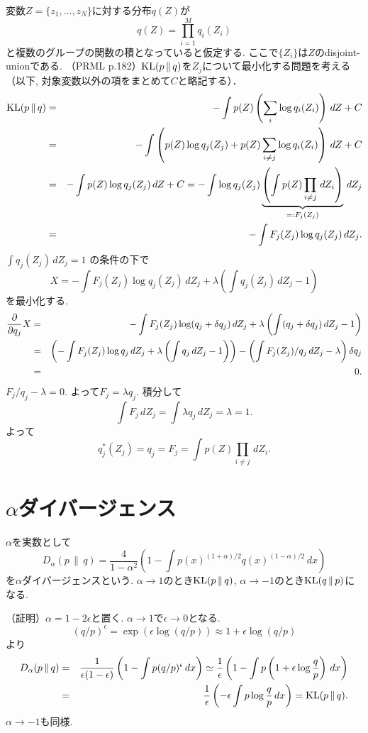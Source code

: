 変数$Z=\{z_1, \ldots, z_N \}$に対する分布$q(Z)$が
$$
q(Z)=\prod_{i=1}^M q_i(Z_i)
$$
と複数のグループの関数の積となっていると仮定する. ここで$\{Z_i\}$は$Z$のdisjoint-unionである.
（PRML p.182）$\mathop{\mathrm{KL}}\nolimits(p\,\|\,q)$を$Z_j$について最小化する問題を考える（以下, 対象変数以外の項をまとめて$C$と略記する）．
\begin{eqnarray*}
\mathop{\mathrm{KL}}\nolimits(p\,\|\,q) &=& -\int p(Z) \left(\sum_i \log q_i(Z_i)\right)\,dZ + C \\
   &=& -\int \left(p(Z) \log q_j(Z_j) + p(Z) \sum_{i \ne j} \log q_i(Z_i)\right)\,dZ + C \\
   &=& -\int p(Z) \log q_j(Z_j)\,dZ + C
   = -\int \log q_j(Z_j)\underbrace{\left(\int p(Z) \prod_{i\ne j}\,dZ_i\right)}_{=:F_j(Z_j)}\,dZ_j\\
   &=& -\int F_j(Z_j) \log q_j(Z_j)\,dZ_j.
\end{eqnarray*}
$
\int q_j(Z_j)\,dZ_j=1
$
の条件の下で
$$
X=-\int F_j(Z_j) \log q_j(Z_j)\,dZ_j + \lambda \left(\int q_j(Z_j)\,dZ_j-1\right)
$$
を最小化する.
\begin{eqnarray*}
\frac{\partial}{\partial q_j}X &=& -\int F_j(Z_j) \log (q_j + \delta q_j)\,dZ_j + \lambda \left(\int (q_j + \delta q_j)\,dZ_j-1\right)\\
 &=&\left(-\int F_j(Z_j) \log q_j\,dZ_j + \lambda \left(\int q_j\,dZ_j - 1\right)\right)-\left(\int F_j(Z_j)/q_j\,dZ_j - \lambda\right)\delta q_j
\\
 &=& 0.
\end{eqnarray*}
$F_j/q_j - \lambda = 0.$
よって$F_j=\lambda q_j$. 積分して
$$
\int F_j\,dZ_j = \int \lambda q_j\,dZ_j=\lambda=1.
$$
よって
$$
q_j^*(Z_j)=q_j=F_j=\int p(Z) \prod_{i \ne j}\,dZ_i.
$$
\vspace{0pt}

\section{$\alpha$ダイバージェンス}
$\alpha$を実数として
$$
D_\alpha(p\,\|\,q)=\frac{4}{1-\alpha^2}\left(1-\int p(x)^{(1+\alpha)/2} q(x)^{(1-\alpha)/2}\,dx\right)
$$
を$\alpha$ダイバージェンスという.
$\alpha \rightarrow 1$のとき$\mathop{\mathrm{KL}}\nolimits(p\,\|\,q)$, $\alpha \rightarrow -1$のとき$\mathop{\mathrm{KL}}\nolimits(q\,\|\,p)$になる.

（証明）$\alpha=1-2\epsilon$と置く. $\alpha \rightarrow 1$で$\epsilon \rightarrow 0$となる.
$$
(q/p)^\epsilon=\exp\left(\epsilon \log(q/p)\right) \approx 1 + \epsilon \log(q/p)
$$
より
\begin{eqnarray*}
D_\alpha(p\,\|\,q)
 &=& \frac{1}{\epsilon(1-\epsilon)}\left(1-\int p(q/p)^\epsilon\,dx\right)
 \simeq \frac{1}{\epsilon}\left(1-\int p\left(1+\epsilon \log \frac{q}{p}\right)\,dx\right) \\
 &=& \frac{1}{\epsilon}\left(-\epsilon \int p \log \frac{q}{p}\,dx\right)=\mathop{\mathrm{KL}}\nolimits(p\,\|\,q).
\end{eqnarray*}
$\alpha \rightarrow -1$も同様.

